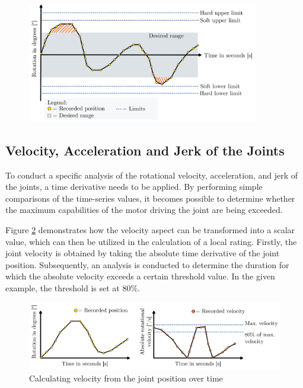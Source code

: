 \begin{figure}[H]
	\centerline{\includegraphics[width=0.9\textwidth]{figures/limits.png}}
	\caption{}
	\label{limits}
\end{figure}

\subsection{Velocity, Acceleration and Jerk of the Joints}\label{VAJJ}
To conduct a specific analysis of the rotational velocity, acceleration, and jerk of the joints, a time derivative needs to be applied. By performing simple comparisons of the time-series values, it becomes possible to determine whether the maximum capabilities of the motor driving the joint are being exceeded.

Figure \ref{velo} demonstrates how the velocity aspect can be transformed into a scalar value, which can then be utilized in the calculation of a local rating. Firstly, the joint velocity is obtained by taking the absolute time derivative of the joint position. Subsequently, an analysis is conducted to determine the duration for which the absolute velocity exceeds a certain threshold value. In the given example, the threshold is set at 80\%. 

\begin{figure}[H]
	\centerline{\includegraphics[width=1\textwidth]{figures/veloy.png}}
	\caption{Calculating velocity from the joint position over time}
	\label{velo}
\end{figure}

